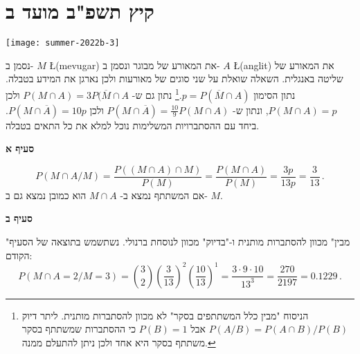 



\section{קיץ תשפ"ב מועד ב}

\begin{center}
\texttt{[image: summer-2022b-3]}
\end{center}

נסמן ב-%
$M$ \L{(mevugar)}
את המאורע של מבוגר ונסמן ב-%
$A$ \L{(anglit)}
את המאורע של שליטה באנגלית. השאלה שואלת על שני סוגים של מאורעות ולכן נארגן את המידע בטבלה. נתון הסימון
$p=P(\overline{M}\cap A)$.\footnote{%
הניסוח "מבין כלל המשתתפים בסקר" לא מכוון להסתברות מותנית. ליתר דיוק 
$P(A/B)=P(A\cap B)/P(B)$
אבל
$P(B)=1$
כי ההסתברות שמשתתף בסקר משתתף בסקר היא אחד ולכן ניתן להתעלם ממנה.}
נתון גם ש-%
$P(M\cap A)=3P(\overline{M}\cap A$
ולכן
$P(M\cap A)=p$,
ונתון ש-%
$P(M\cap \overline{A})=\frac{10}{9}P(M\cap A)$
ולכן
$P(M\cap \overline{A})=10p$.
ביחד עם ההסתברויות המשלימות נוכל למלא את כל התאים בטבלה.
\begin{center}
\end{center}

\textbf{סעיף א}

\[
P(M\cap A/M)=\frac{P((M\cap A)\cap M)}{P(M)}=\frac{P(M\cap A)}{P(M)}=\frac{3p}{13p}=\frac{3}{13}\,.
\]
אם המשתתף נמצא ב-%
$M\cap A$
הוא כמובן נמצא גם ב-%
$M$.

\textbf{סעיף ב}

"מבין" מכוון להסתברות מותנית ו-"בדיוק" מכוון לנוסחת ברנולי. נשתשמש בתוצאה של הסעיף הקודם:
\[
P(M\cap A=2/M=3)={3\choose 2}\left(\frac{3}{13}\right)^2
\left(\frac{10}{13}\right)^1=\frac{3\cdot 9\cdot 10}{13^3}=
\frac{270}{2197}=0.1229\,.
\]

